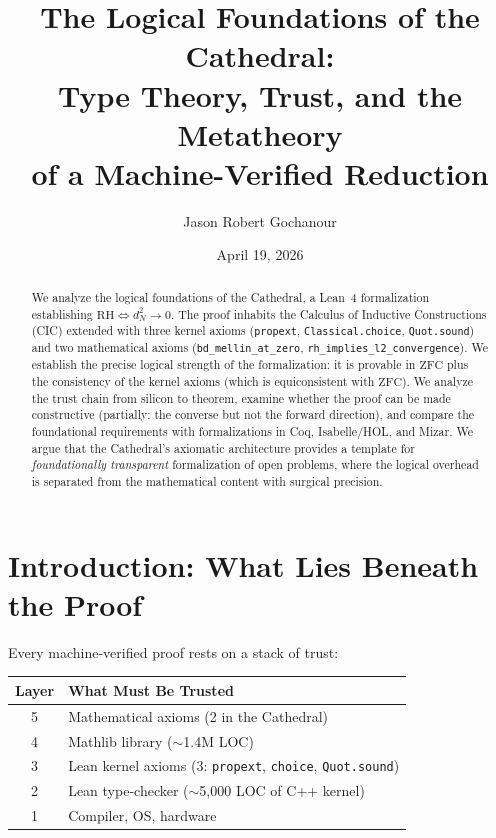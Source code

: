 \documentclass[11pt,a4paper]{article}
\title{%
  The Logical Foundations of the Cathedral:\\
  Type Theory, Trust, and the Metatheory\\
  of a Machine-Verified Reduction%
}
\author{
  Jason Robert Gochanour
}
\date{April 19, 2026}
\theoremstyle{plain}
\theoremstyle{definition}
\newcommand{\lean}[1]{\texttt{#1}}
\newcommand{\RH}{\ensuremath{\mathrm{RH}}}
\newcommand{\ZFC}{\mathrm{ZFC}}
\begin{document}
\maketitle

\begin{abstract}
We analyze the logical foundations of the Cathedral, a Lean~4
formalization establishing $\RH \iff d_N^2 \to 0$.
The proof inhabits the Calculus of Inductive Constructions (CIC)
extended with three kernel axioms (\lean{propext}, \lean{Classical.choice},
\lean{Quot.sound}) and two mathematical axioms
(\lean{bd\_mellin\_at\_zero}, \lean{rh\_implies\_l2\_convergence}).
We establish the precise logical strength of the formalization:
it is provable in $\ZFC$ plus the consistency of the kernel axioms
(which is equiconsistent with $\ZFC$). We analyze the trust chain
from silicon to theorem, examine whether the proof can be made
constructive (partially: the converse but not the forward direction),
and compare the foundational requirements with formalizations in
Coq, Isabelle/HOL, and Mizar. We argue that the Cathedral's
axiomatic architecture provides a template for \emph{foundationally
transparent} formalization of open problems, where the logical
overhead is separated from the mathematical content with surgical
precision.
\end{abstract}

\tableofcontents

\section{Introduction: What Lies Beneath the Proof}

Every machine-verified proof rests on a stack of trust:

\begin{center}
\begin{tabular}{@{}cl@{}}
\toprule
\textbf{Layer} & \textbf{What Must Be Trusted} \\
\midrule
5 & Mathematical axioms (2 in the Cathedral) \\
4 & Mathlib library ($\sim$1.4M LOC) \\
3 & Lean kernel axioms (3: \lean{propext}, \lean{choice}, \lean{Quot.sound}) \\
2 & Lean type-checker ($\sim$5{,}000 LOC of C++ kernel) \\
1 & Compiler, OS, hardware \\
\bottomrule
\end{tabular}
\end{center}
\end{document}
